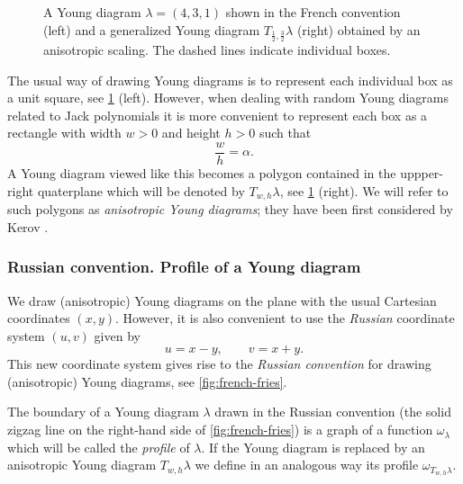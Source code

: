 \documentclass[12pt,usenames,dvipsnames,svgnames,table]{amsart}
\begin{document}
\begin{figure}[tbp]
\begin{center}
	\end{center}
	
	\caption{A Young diagram $\lambda=(4,3,1)$ shown in the French convention (left)
		and a generalized Young diagram $T_{\frac{1}{2},\frac{3}{2}} \lambda$ (right)
		obtained by an anisotropic scaling. The dashed lines indicate individual boxes.}
	\label{fig:stretch}
\end{figure}

The usual way of drawing Young diagrams is to represent each individual box as a unit square,
see \cref{fig:stretch} (left).
However, when dealing with random Young diagrams related to Jack polynomials
it is more convenient to represent each box as a rectangle with width $w>0$ and height $h>0$ such that
\begin{equation}
\label{eq:aspect-ratio}
\frac{w}{h} = \alpha.   
\end{equation}
A Young diagram viewed like this becomes a polygon contained in the uppper-right quaterplane
which will be denoted by $T_{w,h}\lambda$, see \cref{fig:stretch} (right).
We will refer to such polygons as \emph{anisotropic Young diagrams};
they have been first considered by Kerov \cite{Kerov2000}.

\subsubsection{Russian convention. Profile of a Young diagram}
We draw (a\-ni\-so\-tro\-pic) Young diagrams on the plane 
with the usual Cartesian coordinates $(x,y)$.
However, it is also convenient to use the \emph{Russian} coordinate system 
$(u,v)$ given by
\[ u = x-y, \qquad v = x+y. \]
This new coordinate system gives rise to the \emph{Russian convention} 
for drawing (anisotropic) Young diagrams, see \cref{fig:french-fries}.

The boundary of a Young diagram $\lambda$ 
drawn in the Russian convention
(the solid zigzag line on the right-hand side of \cref{fig:french-fries})
is a graph of a function $\omega_\lambda$ 
which will be called the \emph{profile} of $\lambda$.
If the Young diagram is replaced by an anisotropic
Young diagram $T_{w,h}\lambda$
we define in an analogous way its profile $\omega_{T_{w,h}\lambda}$.
\end{document}
